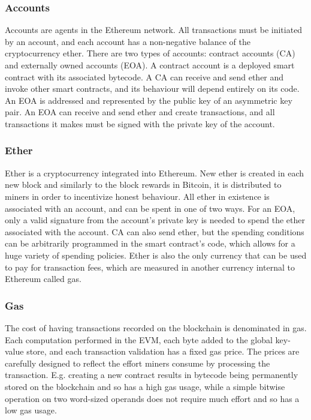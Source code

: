 \subsubsection{Accounts}
Accounts are agents in the Ethereum network. All transactions must be initiated by an account, and each account has a non-negative balance of the cryptocurrency ether. There are two types of accounts: contract accounts (CA) and externally owned accounts (EOA). A contract account is a deployed smart contract with its associated bytecode. A CA can receive and send ether and invoke other smart contracts, and its behaviour will depend entirely on its code. An EOA is addressed and represented by the public key of an asymmetric key pair. An EOA can receive and send ether and create transactions, and all transactions it makes must be signed with the private key of the account. 

\subsubsection{Ether}
Ether is a cryptocurrency integrated into Ethereum. New ether is created in each new block and similarly to the block rewards in Bitcoin, it is distributed to miners in order to incentivize honest behaviour. All ether in existence is associated with an account, and can be spent in one of two ways. For an EOA, only a valid signature from the account's private key is needed to spend the ether associated with the account. CA can also send ether, but the spending conditions can be arbitrarily programmed in the smart contract's code, which allows for a huge variety of spending policies. Ether is also the only currency that can be used to pay for transaction fees, which are measured in another currency internal to Ethereum called gas.

\subsubsection{Gas}
The cost of having transactions recorded on the blockchain is denominated in gas. Each computation performed in the EVM, each byte added to the global key-value store, and each transaction validation has a fixed gas price. The prices are carefully designed to reflect the effort miners consume by processing the transaction. E.g. creating a new contract results in bytecode being permanently stored on the blockchain and so has a high gas usage, while a simple bitwise operation on two word-sized operands does not require much effort and so has a low gas usage.

